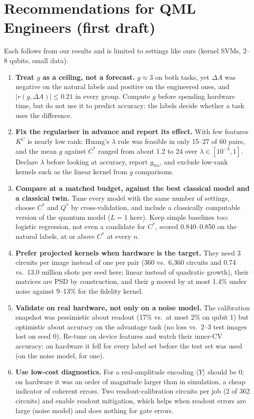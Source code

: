 \documentclass[conference]{IEEEtran}
\begin{document}
\section{Recommendations for QML Engineers (first draft)}\label{sec:rec}
Each follows from our results and is limited to settings like ours (kernel SVMs, 2--8 qubits, small data).
\begin{enumerate}
\item \textbf{Treat $g$ as a ceiling, not a forecast.} $g\approx3$ on both tasks, yet $\Delta A$ was negative on the natural labels and positive on the engineered ones, and $|r(g,\Delta A)|\le0.21$ in every group. Compute $g$ before spending hardware time, but do not use it to predict accuracy: the labels decide whether a task uses the difference.
\item \textbf{Fix the regulariser in advance and report its effect.} With few features $K^C$ is nearly low rank: Huang's $\lambda$ rule was feasible in only 15--27 of 60 pairs, and the mean $g$ against $C^\ast$ ranged from about 1.2 to 24 over $\lambda\in[10^{-3},1]$. Declare $\lambda$ before looking at accuracy, report $g_{\mathrm{tra}}$, and exclude low-rank kernels such as the linear kernel from $g$ comparisons.
\item \textbf{Compare at a matched budget, against the best classical model and a classical twin.} Tune every model with the same number of settings, choose $C^\ast$ and $Q^\ast$ by cross-validation, and include a classically computable version of the quantum model ($L=1$ here). Keep simple baselines too: logistic regression, not even a candidate for $C^\ast$, scored 0.840--0.850 on the natural labels, at or above $C^\ast$ at every $n$.
\item \textbf{Prefer projected kernels when hardware is the target.} They need 3 circuits per image instead of one per pair (360 vs.\ 6{,}360 circuits and 0.74 vs.\ 13.0 million shots per seed here; linear instead of quadratic growth), their matrices are PSD by construction, and their $g$ moved by at most 1.4\% under noise against 9--13\% for the fidelity kernel.
\item \textbf{Validate on real hardware, not only on a noise model.} The calibration snapshot was pessimistic about readout (17\% vs.\ at most 2\% on qubit 1) but optimistic about accuracy on the advantage task (no loss vs.\ 2--3 test images lost on seed 0). Re-tune on device features and watch their inner-CV accuracy: on hardware it fell for every label set before the test set was used (on the noise model, for one).
\item \textbf{Use low-cost diagnostics.} For a real-amplitude encoding $\langle Y\rangle$ should be 0; on hardware it was an order of magnitude larger than in simulation, a cheap indicator of coherent errors. Two readout-calibration circuits per job (2 of 362 circuits) and enable readout mitigation, which helps when readout errors are large (noise model) and does nothing for gate errors.

\end{enumerate}
\end{document}
